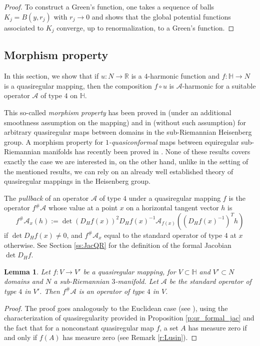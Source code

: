 \documentclass[10pt,letterpaper]{amsart}
\newtheorem{lemma}[thm]{Lemma}
\theoremstyle{definition}
\numberwithin{thm}{subsection}
\numberwithin{equation}{section}
\begin{document}
\begin{proof}
To construct a Green's function, one takes a sequence of balls
$K_j = B(y, r_j)$ with $r_j \rightarrow 0$ and shows that the
global potential functions associated to $K_j$ converge, up to
renormalization, to a Green's function.
\end{proof}

\subsection{Morphism property}\label{s:morphism}

In this section, we show that if $u: N \rightarrow {\mathbb R}$ is a
$4$-harmonic function and $f: {\mathbb H} \rightarrow N$ is a
quasiregular mapping, then the composition $f\circ u$ is $\mathcal
A$-harmonic for a suitable operator $\mathcal A$ of type $4$ on
${\mathbb H}$.

This so-called {\it morphism property} has been proved in
\cite[Theorem 3.14]{MR1630785} (under an additional smoothness
assumption on the mapping) and in \cite{MR1721676} (without such
assumption) for arbitrary quasiregular maps between domains in the
sub-Riemannian Heisenberg group. A morphism property for
\emph{$1$-quasiconformal} maps between equiregular sub-Riemannian
manifolds has recently been proved in \cite{CLDO}. None of these
results covers exactly the case we are interested in, on the other
hand, unlike in the setting of the mentioned results, we can rely
on an already well established theory of quasiregular mappings in
the Heisenberg group.

The {\it pullback} of an operator $\mathcal A$ of type $4$ under a
quasiregular mapping $f$ is the operator $f^\#\mathcal A$ whose
value at a point $x$ on a horizontal tangent vector $h$ is
$$
f^\# \mathcal A_x(h) := \det(D_Hf(x))^2 D_Hf(x)^{-1} \mathcal
A_{f(x)}((D_Hf(x)^{-1})^T h)
$$
if $\det D_H f(x) \neq  0$, and $f^\# \mathcal A_x$ equal to the
standard operator of type $4$ at $x$ otherwise. See Section
\ref{ss:JacQR} for the definition of the formal Jacobian $\det D_H
f$.

\begin{lemma}\label{lem:morphism1}
Let $f: V \rightarrow V'$ be a quasiregular mapping, for $V\subset {\mathbb H}$ and $V' \subset N$ domains and $N$ a sub-Riemannian $3$-manifold.
Let $\mathcal A$ be the standard operator of type $4$ in $V'$. Then $f^\#\mathcal A$ is an operator of type $4$ in $V$.
\end{lemma}

\begin{proof}
The proof goes analogously to the Euclidean
case (see \cite[Lemma 14.38]{MR1207810}), using the
characterization of quasiregularity provided in Proposition
\ref{p:qr_formal_jac} and the fact that for a nonconstant
quasiregular map $f$, a set $A$ has measure zero if and only if
$f(A)$ has measure zero (see Remark \ref{r:Lusin}).
\end{proof}
\end{document}
